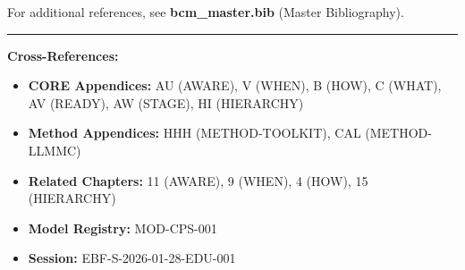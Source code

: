 \vspace{1em}
\noindent For additional references, see \textbf{bcm\_master.bib} (Master Bibliography).

\nocite{bcm_master}



\vspace{2em}
\hrule
\vspace{1em}

\textbf{Cross-References:}
\begin{itemize}[nosep]
\item \textbf{CORE Appendices:} AU (AWARE), V (WHEN), B (HOW), C (WHAT), AV (READY), AW (STAGE), HI (HIERARCHY)
\item \textbf{Method Appendices:} HHH (METHOD-TOOLKIT), CAL (METHOD-LLMMC)
\item \textbf{Related Chapters:} 11 (AWARE), 9 (WHEN), 4 (HOW), 15 (HIERARCHY)
\item \textbf{Model Registry:} MOD-CPS-001
\item \textbf{Session:} EBF-S-2026-01-28-EDU-001
\end{itemize}


